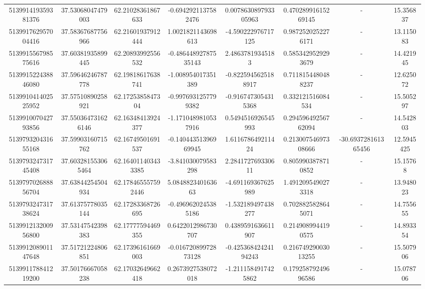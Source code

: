\documentclass{article}
\begin{document}
\begin{landscape}
\begin{longtable}[c]{S[table-format=18.0]S[table-format=2.15]S[table-format=2.15]S[table-format=-2.17]S[table-format=-2.16]S[table-format=-2.16]S[table-format=-3.16]S[table-format=2.7]}
513991419359381376 & 37.53068047479003  & 62.21028361867633  & -0.6942921137582476   & 0.007863089793305963  & 0.47028991615269145 & {-}                  & 15.356837  \\
513991762957004416 & 37.58367687756966  & 62.21601937912444  & 1.0021821143698613    & -4.590222976717125    & 0.9872520252276171  & {-}                  & 13.115083  \\
513991556798575616 & 37.60381935899445  & 62.20893992556532  & -0.48644892787535143  & 2.48637819345183      & 0.5853429529293679  & {-}                  & 14.421945  \\
513991522438846080 & 37.59646246787778  & 62.19818617638741  & -1.008954017351389    & -0.8225945625188917   & 0.7118154480488237  & {-}                  & 12.625072  \\
513991041402525952 & 37.57510890258921  & 62.1725385847304   & -0.9976931257799382   & -0.9167473054315368   & 0.332121516084534   & {-}                  & 15.505297  \\
513991007042793856 & 37.550364731626146 & 62.16348413924377  & -1.1710489810537916   & 0.5494516926545993    & 0.29459649256762094 & {-}                  & 14.542803  \\
513979320431655168 & 37.59903160715762  & 62.16749501691537  & -0.14044351396969945  & 1.611678649211424     & 0.21300754697308666 & -30.693728161365456 & 12.5945425 \\
513979324731745408 & 37.603281553065464 & 62.164011403433385 & -3.841030079583298    & 2.284172769330611     & 0.8059903878710852  & {-}                  & 15.15768   \\
513979702688856704 & 37.63844254504934  & 62.178465557592446 & 5.084882340163663     & -4.691169367625989    & 1.4912095490273318  & {-}                  & 13.948023  \\
513979324731738624 & 37.61375778035144  & 62.17283368726695  & -0.4969620245385186   & -1.532189497438277    & 0.7028825828645071  & {-}                  & 14.755655  \\
513991213200956800 & 37.53147542398383  & 62.17777594469355  & 0.6422012986730707    & 0.4389591636611907    & 0.2149089944190575  & {-}                  & 14.893354  \\
513991208901147648 & 37.51721224806851  & 62.17396161669003  & -0.01672089972873128  & -0.42536842424194243  & 0.21674929003013255 & {-}                  & 15.507906  \\
513991178841219200 & 37.50176667058238  & 62.17032649662418  & 0.2673927538072018    & -1.2111584917425862   & 0.17925879249696586 & {-}                  & 15.078706  \\

\end{longtable}
\end{landscape}
\end{document}
